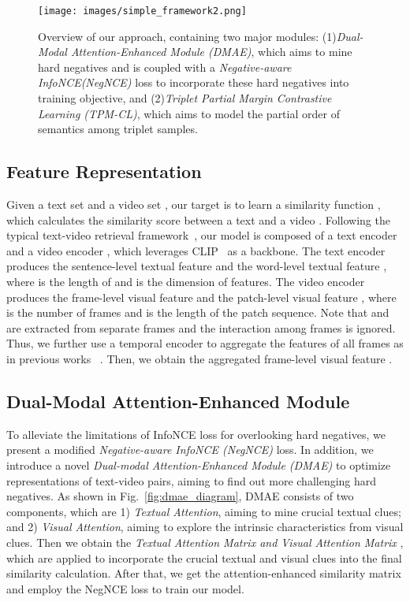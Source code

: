 \documentclass[sigconf]{acmart}
\begin{document}
\begin{figure}[ht!] \centering
  \texttt{[image: images/simple\_framework2.png]}
  \caption{Overview of our approach, containing two major modules: (1)\textit{Dual-Modal Attention-Enhanced Module
(DMAE)}, which aims to mine hard negatives and is coupled with a \textit{Negative-aware InfoNCE(NegNCE)} loss to incorporate these hard negatives into training objective, and (2)\textit{Triplet Partial Margin
Contrastive Learning (TPM-CL)}, which aims to model the partial order of semantics among triplet samples.}
  \label{fig:framework}
\end{figure}


\subsection{Feature Representation}\label{subsec:feats}
Given a text set  and a video set , our target is to learn a similarity function , which calculates the similarity score between a text  and a video .
Following the typical text-video retrieval framework~\cite{clip4clip2021, clip2tv2021,clip2video2021}, our model is composed of a text encoder  and a video encoder , which leverages CLIP~\cite{clip2021} as a backbone. The text encoder  produces the sentence-level textual feature  and the word-level textual feature , where  is the length of  and  is the dimension of features. The video encoder  produces the frame-level visual feature  and the patch-level visual feature , where  is the number of frames and  is the length of the patch sequence.
Note that  and  are extracted from separate frames and the interaction among frames is ignored. Thus, we further use a temporal encoder to aggregate the features of all frames as in previous works ~\cite{clip4clip2021,ts2net2022,xclip2022,xpool2022}. Then, we obtain the aggregated frame-level visual feature .


\subsection{Dual-Modal Attention-Enhanced Module}\label{subsec:dmae}

To alleviate the limitations of InfoNCE loss for overlooking hard negatives, we present a modified \textit{Negative-aware InfoNCE (NegNCE)} loss. 
In addition, we introduce a novel \textit{Dual-modal Attention-Enhanced Module (DMAE)} to optimize representations of text-video pairs, aiming to find out more challenging hard negatives. 
As shown in Fig.~\ref{fig:dmae_diagram}, DMAE consists of two components, which are 1) \textit{Textual Attention}, aiming to mine crucial textual clues; and 2) \textit{Visual Attention}, aiming to explore the intrinsic characteristics from visual clues. 
Then we obtain the \textit{Textual Attention Matrix  and Visual Attention Matrix }, which are applied to incorporate the crucial textual and visual clues into the final similarity calculation. After that, we get the attention-enhanced similarity matrix  and employ the NegNCE loss to train our model.
\end{document}
